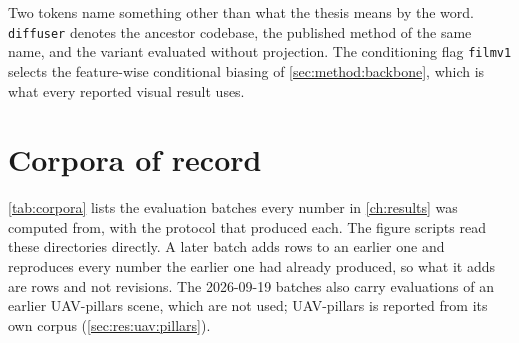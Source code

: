 Two tokens name something other than what the thesis means by the word. \texttt{diffuser} denotes the ancestor codebase, the published method of the same name, and the variant evaluated without projection. The conditioning flag \texttt{filmv1} selects the feature-wise conditional biasing of \autoref{sec:method:backbone}, which is what every reported visual result uses.

\section*{Corpora of record}

\autoref{tab:corpora} lists the evaluation batches every number in \autoref{ch:results} was computed
from, with the protocol that produced each. The figure scripts read these directories directly. A later
batch adds rows to an earlier one and reproduces every number the earlier one had already produced, so
what it adds are rows and not revisions. The 2026-09-19 batches also carry evaluations of an earlier
UAV-pillars scene, which are not used; UAV-pillars is reported from its own corpus
(\autoref{sec:res:uav:pillars}).

